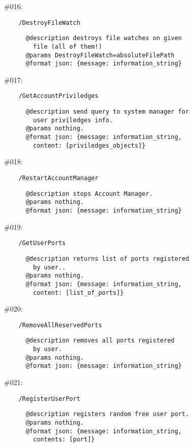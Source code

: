 \documentclass[11pt]{scrartcl}
\begin{document}
\begin{description}
    \item \#016:
      \begin{verbatim}
    /DestroyFileWatch
      \end{verbatim}
      \begin{verbatim}
      @description destroys file watches on given
        file (all of them!)
      @params DestroyFileWatch=absoluteFilePath
      @format json: {message: information_string}
      \end{verbatim}

    \item \#017:
      \begin{verbatim}
    /GetAccountPriviledges
      \end{verbatim}
      \begin{verbatim}
      @description send query to system manager for
        user priviledges info.
      @params nothing.
      @format json: {message: information_string,
        content: [priviledges_objects]}
      \end{verbatim}


    \item \#018:
      \begin{verbatim}
    /RestartAccountManager
      \end{verbatim}
      \begin{verbatim}
      @description stops Account Manager.
      @params nothing.
      @format json: {message: information_string}
      \end{verbatim}

    \item \#019:
      \begin{verbatim}
    /GetUserPorts
      \end{verbatim}
      \begin{verbatim}
      @description returns list of ports registered
        by user..
      @params nothing.
      @format json: {message: information_string,
        content: [list_of_ports]}
      \end{verbatim}

    \item \#020:
      \begin{verbatim}
    /RemoveAllReservedPorts
      \end{verbatim}
      \begin{verbatim}
      @description removes all ports registered
        by user.
      @params nothing.
      @format json: {message: information_string}
      \end{verbatim}

    \item \#021:
      \begin{verbatim}
    /RegisterUserPort
      \end{verbatim}
      \begin{verbatim}
      @description registers random free user port.
      @params nothing.
      @format json: {message: information_string,
        contents: [port]}
      \end{verbatim}

\end{description}
\end{document}
